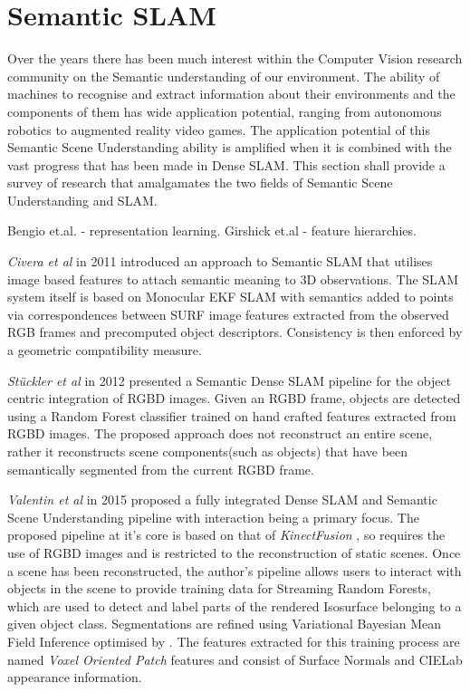 \section{Semantic SLAM}
Over the years there has been much interest within the Computer Vision research community on 
the Semantic understanding of our environment. The ability of machines to recognise and extract 
information about their environments and the components of them has wide application potential, 
ranging from autonomous robotics to augmented reality video games. The application potential 
of this Semantic Scene Understanding ability is amplified when it is combined with the vast 
progress that has been made in Dense SLAM. This section shall provide a survey of research 
that amalgamates the two fields of Semantic Scene Understanding and SLAM.

Bengio et.al. \cite{Bengio2013} - representation learning.
Girshick et.al \cite{Girshick2014} - feature hierarchies.

\label{sec:lit_review_semantic}
\textit{Civera et al} \cite{Civera2011} in 2011 introduced an approach to Semantic SLAM 
that utilises image based features to attach semantic meaning to 3D observations. The SLAM 
system itself is based on Monocular EKF SLAM with semantics added to points via 
correspondences between SURF image features extracted from the observed RGB frames and 
precomputed object descriptors. Consistency is then enforced by a geometric compatibility 
measure.

\textit{St{\"u}ckler et al} \cite{Stuckler2012} in 2012 presented a Semantic Dense SLAM 
pipeline for the object centric integration of RGBD images. Given an RGBD frame, objects 
are detected using a Random Forest classifier trained on hand crafted features extracted 
from RGBD images. The proposed approach does not reconstruct an entire scene, rather it 
reconstructs scene components(such as objects) that have been semantically segmented 
from the current RGBD frame.

\textit{Valentin et al} \cite{Valentin2015} in 2015 proposed a fully integrated Dense SLAM 
and Semantic Scene Understanding pipeline with interaction being a primary focus. The 
proposed pipeline at it's core is based on that of \textit{KinectFusion} \cite{Newcombe2011}, 
so requires the use of RGBD images and is restricted to the reconstruction of static scenes. 
Once a scene has been reconstructed, the author's pipeline allows users to interact with 
objects in the scene to provide training data for Streaming Random Forests\cite{Abdulsalam2007}, 
which are used to detect and label parts of the rendered Isosurface belonging to a given 
object class. Segmentations are refined using Variational Bayesian Mean Field Inference 
\cite{Xing2002} optimised by \cite{Krahenbuhl2011}. The features extracted for this training 
process are named \textit{Voxel Oriented Patch} features and consist of Surface Normals 
and CIELab appearance information.

